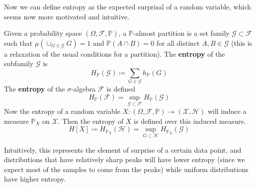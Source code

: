 \documentclass{article}
\begin{document}
    Now we can define entropy as the expected surprisal of a random variable, which seems now more motivated and intuitive. 

    \begin{definition}[Entropy]
      Given a probability space $(\Omega, \mathcal{F}, \mathbb{P})$, a $\mathbb{P}$-almost partition is a set family $\mathcal{G} \subset \mathcal{F}$ such that $\mu(\cup_{G \in \mathcal{G}} G) = 1$ and $\mathbb{P}(A \cap B) = 0$ for all distinct $A, B \in \mathcal{G}$ (this is a relaxation of the usual conditions for a partition). The \textbf{entropy} of the subfamily $\mathcal{G}$ is 
      \begin{equation}
        H_\mathbb{P} (\mathcal{G}) \coloneqq \sum_{G \in \mathcal{G}} h_\mathbb{P}(G)
      \end{equation}
      The \textbf{entropy} of the $\sigma$-algebra $\mathcal{F}$ is defined 
      \begin{equation}
        H_\mathbb{P} (\mathcal{F}) = \sup_{\mathcal{G} \subset \mathcal{F}} H_\mathbb{P} (\mathcal{G})
      \end{equation}
      Now the entropy of a random variable $X: (\Omega, \mathcal{F}, \mathbb{P}) \rightarrow (\mathcal{X}, \mathcal{H})$ will induce a measure $\mathbb{P}_X$ on $\mathcal{X}$. Then the entropy of $X$ is defined over this induced measure. 
      \begin{equation}
        H[X] \coloneqq H_{\mathbb{P}_{X}} (\mathcal{H}) = \sup_{G \subset \mathcal{H}} H_{\mathbb{P}_X} (\mathcal{G})
      \end{equation}
    \end{definition}

    Intuitively, this represents the element of surprise of a certain data point, and distributions that have relatively sharp peaks will have lower entropy (since we expect most of the samples to come from the peaks) while uniform distributions have higher entropy. 



\end{document}

